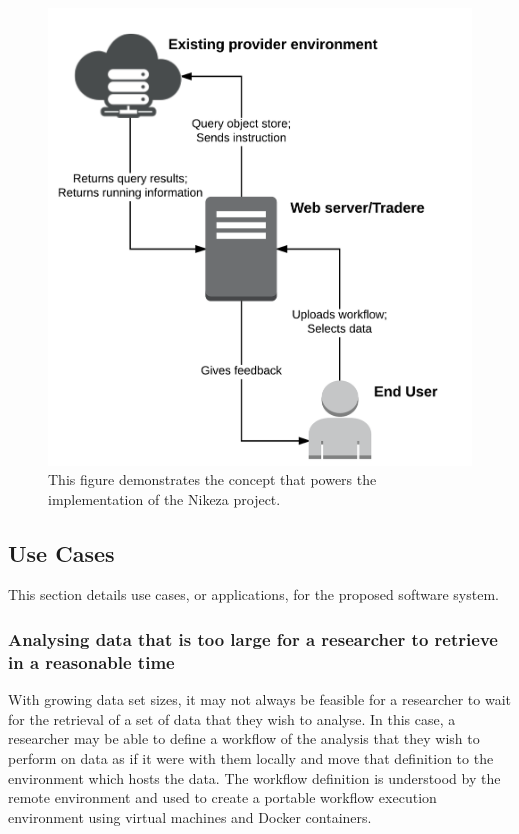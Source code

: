 \begin{figure}[ht!]
\centering
\includegraphics[width=\textwidth]{Figures/2_existing_provider_environment.png}
\decoRule
\caption[Nikeza System Context]{This figure demonstrates the concept that powers the implementation of the Nikeza project.}
\label{fig:existing_provider_environment}
\end{figure}

\subsection{Use Cases}

This section details use cases, or applications, for the proposed software system.

\subsubsection{Analysing data that is too large for a researcher to retrieve in a reasonable time}

With growing data set sizes, it may not always be feasible for a researcher to wait for the retrieval of a set of data that they wish to analyse. In this case, a researcher may be able to define a workflow of the analysis that they wish to perform on data as if it were with them locally and move that definition to the environment which hosts the data. The workflow definition is understood by the remote environment and used to create a portable workflow execution environment using virtual machines and Docker containers.

